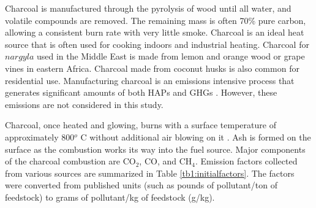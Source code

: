 Charcoal is manufactured through the pyrolysis of wood until all water, and volatile compounds are removed.  The remaining mass is often 70\% pure carbon, allowing a consistent burn rate with very little smoke. Charcoal is an ideal heat source that is often used for cooking indoors and industrial heating.  Charcoal for $nargyla$ used in the Middle East is made from lemon and orange wood or grape vines in eastern Africa.  Charcoal made from coconut husks is also common for residential use.  Manufacturing charcoal is an emissions intensive process that generates significant amounts of both HAPs and GHGs \citep{Lacaux1994}.  However, these emissions are not considered in this study.

Charcoal, once heated and glowing, burns with a surface temperature of approximately 800$^{o}$ C without additional air blowing on it \citep{Evans1977}.  Ash is formed on the surface as the combustion works its way into the fuel source. Major components of the charcoal combustion are CO$_{2}$, CO, and CH$_{4}$.  Emission factors collected from various sources are summarized in Table \ref{tb1:initialfactors}.  The factors were converted from published units (such as pounds of pollutant/ton of feedstock) to grams of pollutant/kg of feedstock (g/kg).

